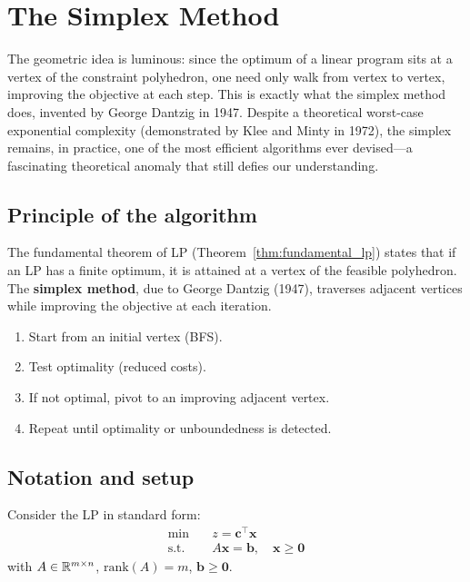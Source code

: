 \chapter{The Simplex Method}
\label{ch:simplex}

The geometric idea is luminous: since the optimum of a linear program sits at a vertex of the constraint polyhedron, one need only walk from vertex to vertex, improving the objective at each step. This is exactly what the simplex method does, invented by George Dantzig in 1947. Despite a theoretical worst-case exponential complexity (demonstrated by Klee and Minty in 1972), the simplex remains, in practice, one of the most efficient algorithms ever devised---a fascinating theoretical anomaly that still defies our understanding.

\section{Principle of the algorithm}

The fundamental theorem of LP (Theorem~\ref{thm:fundamental_lp}) states that
if an LP has a finite optimum, it is attained at a vertex of the feasible
polyhedron.  The \textbf{simplex method}, due to George Dantzig (1947),
traverses adjacent vertices while improving the objective at each iteration.

\begin{algorithme}[title=\textbf{Simplex overview}]
\begin{enumerate}
  \item Start from an initial vertex (BFS).
  \item Test optimality (reduced costs).
  \item If not optimal, pivot to an improving adjacent vertex.
  \item Repeat until optimality or unboundedness is detected.
\end{enumerate}
\end{algorithme}

\section{Notation and setup}

Consider the LP in standard form:
\[
\begin{aligned}
  \min \quad & z = \mathbf{c}^\top \mathbf{x} \\
  \text{s.t.} \quad & A\mathbf{x} = \mathbf{b}, \quad \mathbf{x} \ge \mathbf{0}
\end{aligned}
\]
with $A \in \mathbb{R}^{m \times n}$, $\text{rank}(A) = m$, $\mathbf{b} \ge \mathbf{0}$.

